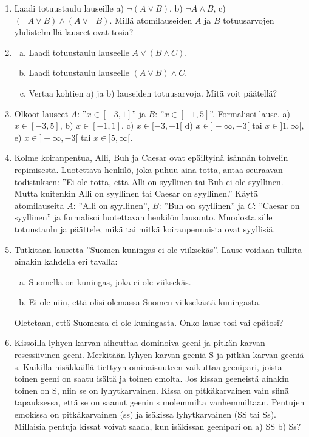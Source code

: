 \begin{enumerate}
\item
Laadi totuustaulu lauseille a) $\lnot(A\lor B)$,  b)  $\lnot A\land B$,  c) $ (\lnot A\lor B)\land (A\lor \lnot B)$. Millä atomilauseiden $A$ ja  $B$ totuusarvojen yhdistelmillä lauseet ovat tosia?

\item
\begin{enumerate}[a)]
\item Laadi totuustaulu lauseelle $A\lor (B\land C)$.  
\item Laadi totuustaulu lauseelle $(A\lor B)\land C$. 
\item Vertaa kohtien a) ja b) lauseiden totuusarvoja. Mitä voit päätellä?
\end{enumerate}

\item Olkoot lauseet $A$: ''$x\in [-3, 1]$'' ja $B$: ''$ x \in [-1, 5]$''. Formalisoi lause.
a) $x\in [-3, 5]$, b) $x\in [-1, 1]$,   c)  $x\in [-3, -1[$  d)  $x\in ]-\infty, -3[$  tai $x\in ]1, \infty[$, 
e) $x\in]-\infty, -3[$  tai $x\in ]5, \infty[$.  

\item Kolme koiranpentua, Alli, Buh ja Caesar ovat epäiltyinä isännän tohvelin repimisestä. Luotettava henkilö, joka puhuu aina totta, antaa seuraavan todistuksen: ''Ei ole totta, että Alli on syyllinen tai Buh ei ole syyllinen. Mutta kuitenkin Alli on syyllinen tai Caesar on syyllinen.'' Käytä atomilauseita $A$: ''Alli on syyllinen'', $B$: ''Buh on syyllinen'' ja $C$: ''Caesar on syyllinen'' ja formalisoi luotettavan henkilön lausunto. Muodosta sille totuustaulu ja päättele, mikä tai mitkä koiranpennuista ovat syyllisiä. 

\item Tutkitaan lausetta ''Suomen kuningas ei ole viiksekäs''. Lause voidaan tulkita ainakin kahdella eri tavalla:
\begin{enumerate}[a)]
\item Suomella on kuningas, joka ei ole viiksekäs.
\item Ei ole niin, että olisi olemassa Suomen viiksekästä kuningasta.
\end{enumerate}
Oletetaan, että Suomessa ei ole kuningasta. Onko lause tosi vai epätosi?

\item
Kissoilla lyhyen karvan aiheuttaa dominoiva geeni ja pitkän karvan resessiivinen geeni. Merkitään lyhyen karvan geeniä S ja pitkän karvan geeniä s. Kaikilla nisäkkäillä tiettyyn ominaisuuteen vaikuttaa geenipari, joista toinen geeni on saatu isältä ja toinen emolta. Jos kissan geeneistä ainakin toinen on S, niin se on lyhytkarvainen. Kissa on pitkäkarvainen vain siinä tapauksessa, että se on saanut geenin s molemmilta vanhemmiltaan.  Pentujen emokissa on pitkäkarvainen (ss) ja isäkissa lyhytkarvainen (SS tai Ss). Millaisia pentuja kissat voivat saada, kun isäkissan geenipari on a) SS b) Ss?

\end{enumerate}

